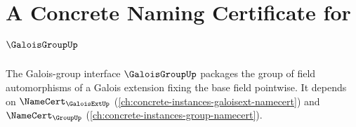 \chapter{A Concrete Naming Certificate for $\GaloisGroupUp$}
\label{ch:concrete-instances-galoisgroup-namecert}

The Galois-group interface $\GaloisGroupUp$ packages the group of field automorphisms of a Galois extension fixing the base field pointwise. It depends on $\NameCert_{\GaloisExtUp}$ (\autoref{ch:concrete-instances-galoisext-namecert}) and $\NameCert_{\GroupUp}$ (\autoref{ch:concrete-instances-group-namecert}).







